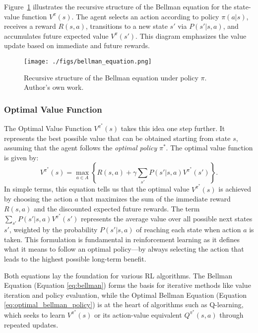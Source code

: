 \documentclass[12pt,a4paper,twoside,openany]{book}
\begin{document}
Figure~\ref{fig:bellman_equation} illustrates the recursive structure of the Bellman equation for the state-value function \(V^{\pi}(s)\). The agent selects an action according to policy \(\pi(a|s)\), receives a reward \(R(s,a)\), transitions to a new state \(s'\) via \(P(s'|s,a)\), and accumulates future expected value \(V^\pi(s')\). This diagram emphasizes the value update based on immediate and future rewards.

\begin{figure}[h]
\centering
\texttt{[image: ./figs/bellman\_equation.png]}
\captionsetup{font=small}
\caption{Recursive structure of the Bellman equation under policy \(\pi\). Author's own work.}
\label{fig:bellman_equation}
\end{figure}

\subsubsection*{Optimal Value Function}
The Optimal Value Function \(V^{\pi^*}(s)\) takes this idea one step further. It represents the best possible value that can be obtained starting from state \(s\), assuming that the agent follows the \emph{optimal policy} \(\pi^*\). The optimal value function is given by:
\begin{equation}
V^{\pi^*}(s) = \max_{a \in A} \left\{ R(s,a) + \gamma \sum_{s'} P(s'|s,a) V^{\pi^*}(s') \right\}.
\label{eq:optimal_bellman_policy}
\end{equation}
In simple terms, this equation tells us that the optimal value \(V^{\pi^*}(s)\) is achieved by choosing the action \(a\) that maximizes the sum of the immediate reward \(R(s,a)\) and the discounted expected future rewards. The term \(\sum_{s'} P(s'|s,a) V^{\pi^*}(s')\) represents the average value over all possible next states \(s'\), weighted by the probability \(P(s'|s,a)\) of reaching each state when action \(a\) is taken. This formulation is fundamental in reinforcement learning as it defines what it means to follow an optimal policy—by always selecting the action that leads to the highest possible long-term benefit.

Both equations lay the foundation for various RL algorithms. The Bellman Equation (Equation \ref{eq:bellman}) forms the basis for iterative methods like value iteration and policy evaluation, while the Optimal Bellman Equation (Equation \ref{eq:optimal_bellman_policy}) is at the heart of algorithms such as Q-learning, which seeks to learn \(V^{\pi^*}(s)\) or its action-value equivalent \(Q^{\pi^*}(s,a)\) through repeated updates.
\end{document}
